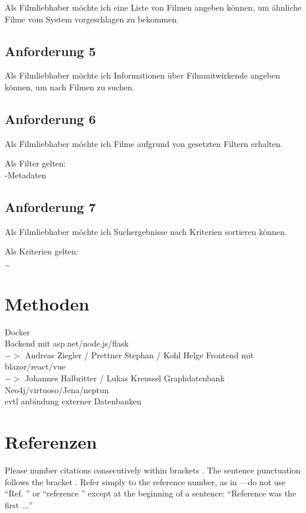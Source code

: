 \documentclass[conference]{IEEEtran}
\begin{document}
Als Filmliebhaber möchte ich eine Liste von Filmen angeben können,
um ähnliche Filme vom System vorgeschlagen zu bekommen.


\subsection{Anforderung 5}
Als Filmliebhaber möchte ich Informationen über Filmmitwirkende angeben können,
um nach Filmen zu suchen.

\subsection{Anforderung 6}

Als Filmliebhaber möchte ich Filme aufgrund von gesetzten Filtern erhalten.

Als Filter gelten:
\\
-Metadaten

\subsection{Anforderung 7}

Als Filmliebhaber möchte ich Suchergebnisse nach Kriterien sortieren können.

Als Kriterien gelten:
\\
\dots
\\

\section{Methoden}

Docker\\ 
Backend mit asp.net/node.js/flask\\ $->$ Andreas Ziegler / Prettner Stephan / Kohl Helge
Frontend mit blazor/react/vue\\	$->$ Johannes Halbritter / Lukas Kreussel
Graphdatenbank Neo4j/virtuoso/Jena/neptun\\
evtl anbindung externer Datenbanken\\




\section*{Referenzen}

Please number citations consecutively within brackets \cite{b1}. The 
sentence punctuation follows the bracket \cite{b2}. Refer simply to the reference 
number, as in \cite{b3}---do not use ``Ref. \cite{b3}'' or ``reference \cite{b3}'' except at 
the beginning of a sentence: ``Reference \cite{b3} was the first $\ldots$''
\end{document}
